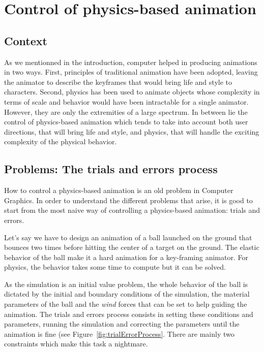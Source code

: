 \section{Control of physics-based animation}

\subsection{Context}
As we mentionned in the introduction, computer helped in producing animations in two ways. First, principles of traditional animation have been adopted, leaving the animator to describe the keyframes that would bring life and style to characters. Second, physics has been used to animate objects whose complexity in terms of scale and behavior would have been intractable for a single animator. However, they are only the extremities of a large spectrum. In between lie the control of physics-based animation which tends to take into account both user directions, that will bring life and style, and physics, that will handle the exciting complexity of the physical behavior.

\subsection{Problems: The trials and errors process}

How to control a physics-based animation is an old problem in Computer Graphics. In order to understand the different problems that arise, it is good to start from the most naive way of controlling a physics-based animation: trials and errors. 

Let's say we have to design an animation of a ball launched on the ground that bounces two times before hitting the center of a target on the ground. The elastic behavior of the ball make it a hard animation for a key-framing animator. For physics, the behavior takes some time to compute but it can be solved.

As the simulation is an initial value problem, the whole behavior of the ball is dictated by the initial and boundary conditions of the simulation, the material parameters of the ball and the \emph{wind} forces that can be set to help guiding the animation. The trials and errors process consists in setting these conditions and parameters, running the simulation and correcting the parameters until the animation is fine (see Figure~\ref{fig:trialErrorProcess}. There are mainly two constraints which make this task a nightmare.

